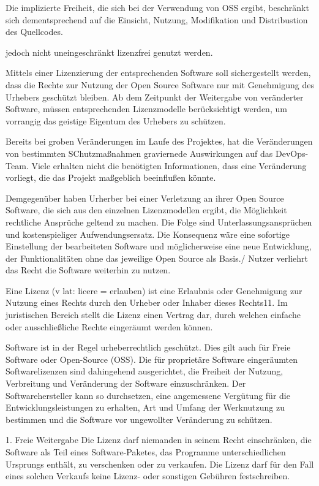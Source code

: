Die implizierte Freiheit, die sich bei der Verwendung von OSS ergibt, beschränkt sich dementsprechend auf die Einsicht, Nutzung, Modifikation und Distribustion des Quellcodes.    

jedoch nicht uneingeschränkt lizenzfrei genutzt werden. 



Mittels einer Lizenzierung der entsprechenden Software soll sichergestellt werden, dass die Rechte zur Nutzung der Open Source Software nur mit Genehmigung des Urhebers geschützt bleiben. Ab dem Zeitpunkt der Weitergabe von veränderter Software, müssen entsprechenden Lizenzmodelle berücksichtigt werden, um vorrangig das geistige Eigentum des Urhebers zu schützen.  

Bereits bei groben Veränderungen im Laufe des Projektes, hat die Veränderungen von bestimmten SChutzmaßnahmen graviernede Auswirkungen auf das DevOps-Team. Viele erhalten nicht die benötigten Informationen, dass eine Veränderung vorliegt, die das Projekt maßgeblich beeinflußen könnte. 

Demgegenüber haben Urherber bei einer Verletzung an ihrer Open Source Software, die sich aus den einzelnen Lizenzmodellen ergibt, die Möglichkeit rechtliche Ansprüche geltend zu machen. Die Folge sind Unterlassungsansprüchen und kostenspieliger Aufwendungsersatz. Die Konsequenz wäre eine sofortige Einstellung der bearbeiteten Software und möglicherweise eine neue Entwicklung, der Funktionalitäten ohne das jeweilige Open Source als Basis./ Nutzer verliehrt das Recht die Software weiterhin zu nutzen.  


Eine
Lizenz (v lat: licere = erlauben) ist eine Erlaubnis oder Genehmigung zur Nutzung
eines Rechts durch den Urheber oder Inhaber dieses Rechts11. Im juristischen
Bereich stellt die Lizenz einen Vertrag dar, durch welchen einfache oder
ausschließliche Rechte eingeräumt werden können. 


Software ist in der Regel urheberrechtlich geschützt. Dies gilt auch für Freie Software oder Open-Source (OSS). Die für proprietäre Software eingeräumten Softwarelizenzen sind dahingehend ausgerichtet, die Freiheit der Nutzung, Verbreitung und Veränderung der Software einzuschränken. Der Softwarehersteller kann so durchsetzen, eine angemessene Vergütung für die Entwicklungsleistungen zu erhalten, Art und Umfang der Werknutzung zu bestimmen und die Software vor ungewollter Veränderung zu schützen. 


1. Freie Weitergabe
Die Lizenz darf niemanden in seinem Recht einschränken, die Software als Teil eines Software-Paketes, das Programme unterschiedlichen Ursprungs enthält, zu verschenken oder zu verkaufen. Die Lizenz darf für den Fall eines solchen Verkaufs keine Lizenz- oder sonstigen Gebühren festschreiben.

